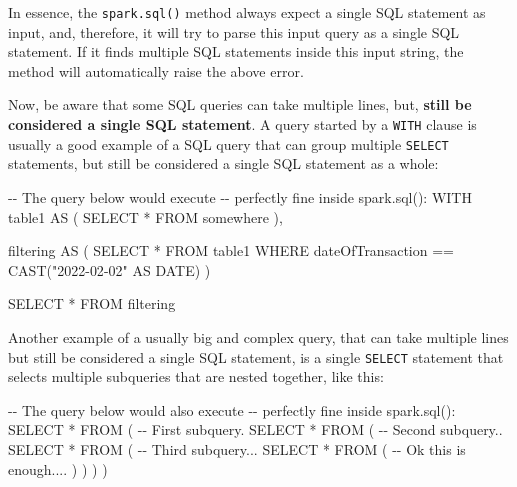 \documentclass[
  11pt,
  letterpaper,
  DIV=11,
  numbers=noendperiod]{scrreprt}
\newenvironment{Shaded}{\begin{snugshade}}{\end{snugshade}}
\newcommand{\CommentTok}[1]{\textcolor[rgb]{0.37,0.37,0.37}{#1}}
\newcommand{\DataTypeTok}[1]{\textcolor[rgb]{0.68,0.00,0.00}{#1}}
\newcommand{\FunctionTok}[1]{\textcolor[rgb]{0.28,0.35,0.67}{#1}}
\newcommand{\KeywordTok}[1]{\textcolor[rgb]{0.00,0.23,0.31}{#1}}
\newcommand{\NormalTok}[1]{\textcolor[rgb]{0.00,0.23,0.31}{#1}}
\newcommand{\OperatorTok}[1]{\textcolor[rgb]{0.37,0.37,0.37}{#1}}
\newcommand{\OtherTok}[1]{\textcolor[rgb]{0.00,0.23,0.31}{#1}}
\begin{document}
In essence, the \texttt{spark.sql()} method always expect a single SQL
statement as input, and, therefore, it will try to parse this input
query as a single SQL statement. If it finds multiple SQL statements
inside this input string, the method will automatically raise the above
error.

Now, be aware that some SQL queries can take multiple lines, but,
\textbf{still be considered a single SQL statement}. A query started by
a \texttt{WITH} clause is usually a good example of a SQL query that can
group multiple \texttt{SELECT} statements, but still be considered a
single SQL statement as a whole:

\begin{Shaded}
\begin{Highlighting}[]
\CommentTok{{-}{-} The query below would execute}
\CommentTok{{-}{-} perfectly fine inside spark.sql():}
\KeywordTok{WITH}\NormalTok{ table1 }\KeywordTok{AS}\NormalTok{ (}
  \KeywordTok{SELECT} \OperatorTok{*}
  \KeywordTok{FROM}\NormalTok{ somewhere}
\NormalTok{),}

\NormalTok{filtering }\KeywordTok{AS}\NormalTok{ (}
  \KeywordTok{SELECT} \OperatorTok{*}
  \KeywordTok{FROM}\NormalTok{ table1}
  \KeywordTok{WHERE}\NormalTok{ dateOfTransaction }\OperatorTok{==} \FunctionTok{CAST}\NormalTok{(}\OtherTok{"2022{-}02{-}02"} \KeywordTok{AS} \DataTypeTok{DATE}\NormalTok{)}
\NormalTok{)}

\KeywordTok{SELECT} \OperatorTok{*}
\KeywordTok{FROM}\NormalTok{ filtering}
\end{Highlighting}
\end{Shaded}

Another example of a usually big and complex query, that can take
multiple lines but still be considered a single SQL statement, is a
single \texttt{SELECT} statement that selects multiple subqueries that
are nested together, like this:

\begin{Shaded}
\begin{Highlighting}[]
\CommentTok{{-}{-} The query below would also execute}
\CommentTok{{-}{-} perfectly fine inside spark.sql():}
\KeywordTok{SELECT} \OperatorTok{*}
\KeywordTok{FROM}\NormalTok{ (}
  \CommentTok{{-}{-} First subquery.}
  \KeywordTok{SELECT} \OperatorTok{*}
  \KeywordTok{FROM}\NormalTok{ (}
    \CommentTok{{-}{-} Second subquery..}
    \KeywordTok{SELECT} \OperatorTok{*}
    \KeywordTok{FROM}\NormalTok{ (}
      \CommentTok{{-}{-} Third subquery...}
      \KeywordTok{SELECT} \OperatorTok{*}
      \KeywordTok{FROM}\NormalTok{ (}
        \CommentTok{{-}{-} Ok this is enough....}
\NormalTok{      )}
\NormalTok{    )}
\NormalTok{  )}
\NormalTok{)}
\end{Highlighting}
\end{Shaded}
\end{document}
